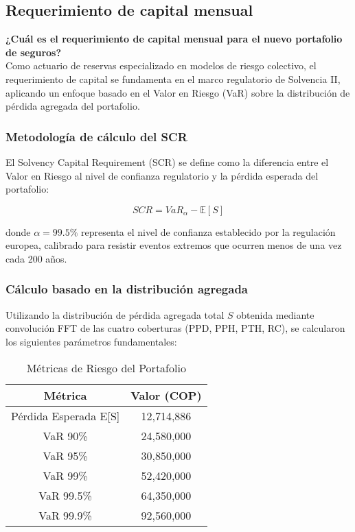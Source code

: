 \subsection{Requerimiento de capital mensual}

\textbf{¿Cuál es el requerimiento de capital mensual para el nuevo portafolio de seguros?}\\

Como actuario de reservas especializado en modelos de riesgo colectivo, el requerimiento de capital se fundamenta en el marco regulatorio de Solvencia II, aplicando un enfoque basado en el Valor en Riesgo (VaR) sobre la distribución de pérdida agregada del portafolio.

\subsubsection{Metodología de cálculo del SCR}

El Solvency Capital Requirement (SCR) se define como la diferencia entre el Valor en Riesgo al nivel de confianza regulatorio y la pérdida esperada del portafolio:

\[SCR = VaR_{\alpha} - \mathbb{E}[S]\]

donde $\alpha = 99.5\%$ representa el nivel de confianza establecido por la regulación europea, calibrado para resistir eventos extremos que ocurren menos de una vez cada 200 años.

\subsubsection{Cálculo basado en la distribución agregada}

Utilizando la distribución de pérdida agregada total $S$ obtenida mediante convolución FFT de las cuatro coberturas (PPD, PPH, PTH, RC), se calcularon los siguientes parámetros fundamentales:

\begin{table}[H]
\centering
\caption{Métricas de Riesgo del Portafolio}
\begin{tabular}{cc}
\hline
\textbf{Métrica} & \textbf{Valor (COP)} \\
\hline
Pérdida Esperada E[S] & 12,714,886 \\
VaR 90\% & 24,580,000 \\
VaR 95\% & 30,850,000 \\
VaR 99\% & 52,420,000 \\
VaR 99.5\% & 64,350,000 \\
VaR 99.9\% & 92,560,000 \\
\hline
\end{tabular}
\end{table}

